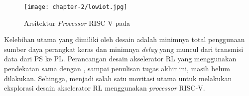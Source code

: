\begin{figure}[H]
	\centering
	\texttt{[image: chapter-2/lowiot.jpg]}
	\caption{Arsitektur \textit{Processor} RISC-V pada \parencite{yang2023design}}
	\label{fig:ilustrasi-lowiot}
\end{figure}

Kelebihan utama yang dimiliki oleh desain \parencite{yang2023design} adalah minimnya total penggunaan sumber daya perangkat keras dan minimnya \textit{delay} yang muncul dari transmisi data dari PS ke PL. Perancangan desain akselerator \ac{RL} yang menggunakan pendekatan sama dengan \parencite{yang2023design}, sampai penulisan tugas akhir ini, masih belum dilakukan. Sehingga, menjadi salah satu movitasi utama untuk melakukan eksplorasi desain akselerator \ac{RL} menggunakan \textit{processor} RISC-V.
